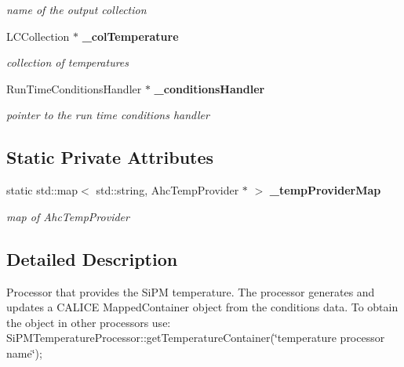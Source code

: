 \begin{DoxyCompactItemize}
\begin{DoxyCompactList}\small\item\em name of the output collection \item\end{DoxyCompactList}\item 
LCCollection $\ast$ {\bf \_\-colTemperature}\label{classCALICE_1_1SiPMTemperatureProcessor_adbf2244effa4e4902692663a4c0f71a8}

\begin{DoxyCompactList}\small\item\em collection of temperatures \item\end{DoxyCompactList}\item 
RunTimeConditionsHandler $\ast$ {\bf \_\-conditionsHandler}\label{classCALICE_1_1SiPMTemperatureProcessor_a40bb02477d3ab8f01a0d5ca7ee1040a8}

\begin{DoxyCompactList}\small\item\em pointer to the run time conditions handler \item\end{DoxyCompactList}\end{DoxyCompactItemize}
\subsection*{Static Private Attributes}
\begin{DoxyCompactItemize}
\item 
static std::map$<$ std::string, AhcTempProvider $\ast$ $>$ {\bf \_\-tempProviderMap}\label{classCALICE_1_1SiPMTemperatureProcessor_ae29d242598f44f0dc52051a3119fbdbe}

\begin{DoxyCompactList}\small\item\em map of AhcTempProvider \item\end{DoxyCompactList}\end{DoxyCompactItemize}


\subsection{Detailed Description}
Processor that provides the SiPM temperature. The processor generates and updates a CALICE MappedContainer object from the conditions data. To obtain the object in other processors use: SiPMTemperatureProcessor::getTemperatureContainer(\char`\"{}temperature processor name\char`\"{});

